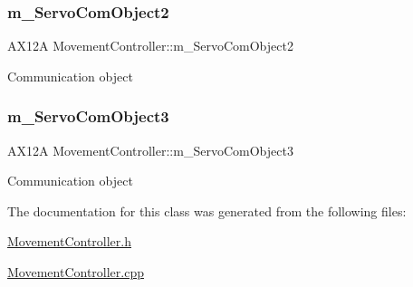 \subsubsection{\texorpdfstring{m\+\_\+\+Servo\+Com\+Object2}{m\_ServoComObject2}}
{\footnotesize\ttfamily A\+X12A Movement\+Controller\+::m\+\_\+\+Servo\+Com\+Object2}

Communication object \mbox{\label{class_movement_controller_afbe7c5a0e099b5e879d64b6ab72f7127}} 
\subsubsection{\texorpdfstring{m\+\_\+\+Servo\+Com\+Object3}{m\_ServoComObject3}}
{\footnotesize\ttfamily A\+X12A Movement\+Controller\+::m\+\_\+\+Servo\+Com\+Object3}

Communication object 

The documentation for this class was generated from the following files\+:\begin{DoxyCompactItemize}
\item 
\mbox{\hyperlink{_movement_controller_8h}{Movement\+Controller.\+h}}\item 
\mbox{\hyperlink{_movement_controller_8cpp}{Movement\+Controller.\+cpp}}\end{DoxyCompactItemize}
